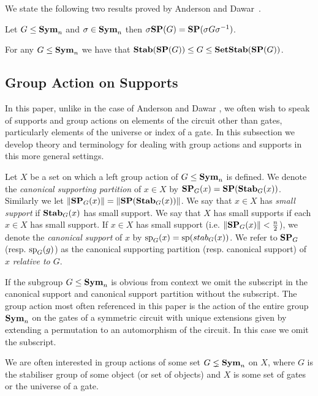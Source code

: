 \documentclass[../paper.tex]{subfiles}
\begin{document}
We state the following two results proved by Anderson and Dawar~\cite{AndersonD17}.

\begin{lem}
  \label{lem:SP-conjugation}
  Let $G \leq \text{\textbf{Sym}}_n$ and $\sigma \in \text{\textbf{Sym}}_n$ then $\sigma \text{\textbf{SP}} (G) = \text{\textbf{SP}}(\sigma
  G \sigma^{-1})$.
\end{lem}

\begin{lem}
  For any $G \leq \text{\textbf{Sym}}_n$ we have that $\text{\textbf{Stab}} (\text{\textbf{SP}} (G)) \leq G \leq
  \text{\textbf{SetStab}}(\text{\textbf{SP}}(G))$.
\end{lem}

\subsection{Group Action on Supports}
\label{subsec:group-actions-on-supports}
In this paper, unlike in the case of Anderson and Dawar \cite{AndersonD17}, we
often wish to speak of supports and group actions on elements of the circuit
other than gates, particularly elements of the universe or index of a gate. In
this subsection we develop theory and terminology for dealing with group actions
and supports in this more general settings.

\begin{definition}
  Let $X$ be a set on which a left group action of $G \leq \text{\textbf{Sym}}_n$ is defined.
  We denote the \emph{canonical supporting partition} of $x \in X$ by $\text{\textbf{SP}}_G (x)
  = \text{\textbf{SP}} (\text{\textbf{Stab}}_G(x))$. Similarly we let $\| \text{\textbf{SP}}_G (x) \| = \| \text{\textbf{SP}} (\text{\textbf{Stab}}_G(x))
  \|$. We say that $x \in X$ has \emph{small support} if $\text{\textbf{Stab}}_G(x)$ has small
  support. We say that $X$ has small supports if each $x \in X$ has small
  support. If $x \in X$ has small support (i.e. $\| \text{\textbf{SP}}_G(x) \| < \frac{n}{2}$),
  we denote the \emph{canonical support} of $x$ by $\text{sp}_G(x) = \text{sp}
  (stab_G(x))$. We refer to $\text{\textbf{SP}}_G$ (resp. $\text{sp}_G(g)$) as the canonical
  supporting partition (resp. canonical support) of $x$ \emph{relative to $G$}.
\end{definition}

If the subgroup $G \leq \text{\textbf{Sym}}_n$ is obvious from context we omit the subscript in
the canonical support and canonical support partition without the subscript. The
group action most often referenced in this paper is the action of the entire
group $\text{\textbf{Sym}}_n$ on the gates of a symmetric circuit with unique extensions given
by extending a permutation to an automorphism of the circuit. In this case we
omit the subscript.

We are often interested in group actions of some set $G \lneq \text{\textbf{Sym}}_n$ on $X$,
where $G$ is the stabiliser group of some object (or set of objects) and $X$ is
some set of gates or the universe of a gate.
\end{document}
